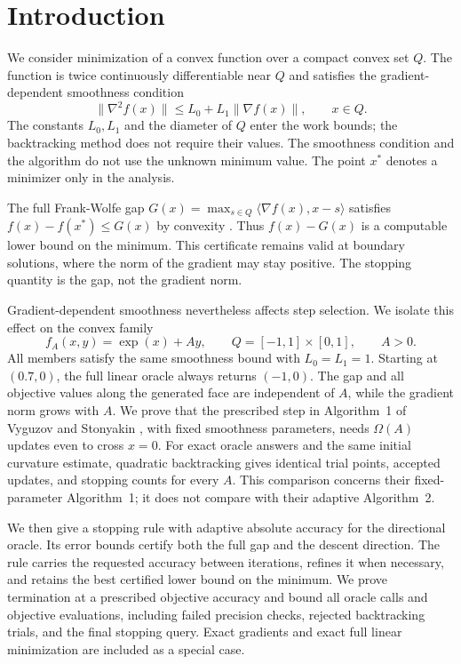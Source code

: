 \section{Introduction}
\label{sec:intro}
We consider minimization of a convex function over a compact convex set
$Q$. The function is twice continuously differentiable near $Q$ and
satisfies the gradient-dependent smoothness condition
\[
 \|\nabla^2 f(x)\|\le L_0+L_1\|\nabla f(x)\|,\qquad x\in Q.
\]
The constants $L_0,L_1$ and the diameter of $Q$ enter the work bounds;
the backtracking method does not require their values.
The smoothness condition and the algorithm do not use the unknown
minimum value. The point $x^*$ denotes a minimizer only in the analysis.

The full Frank-Wolfe gap
$G(x)=\max_{s\in Q}\langle\nabla f(x),x-s\rangle$
satisfies $f(x)-f(x^*)\le G(x)$ by convexity \cite{jaggi}.
Thus $f(x)-G(x)$ is a computable lower bound on the minimum.
This certificate remains valid at boundary solutions, where the
norm of the gradient may stay positive. The stopping quantity is the
gap, not the gradient norm.

Gradient-dependent smoothness nevertheless affects step selection.
We isolate this effect on the convex family
\[
 f_A(x,y)=\exp(x)+Ay,\qquad
 Q=[-1,1]\times[0,1],\qquad A>0.
\]
All members satisfy the same smoothness bound with $L_0=L_1=1$.
Starting at $(0.7,0)$, the full linear oracle always returns $(-1,0)$.
The gap and all objective values along the generated face are independent
of $A$, while the gradient norm grows with $A$.
We prove that the prescribed step in Algorithm~1 of Vyguzov and
Stonyakin \cite{vyguzov}, with fixed smoothness parameters, needs
$\Omega(A)$ updates even to cross $x=0$.
For exact oracle answers and the same initial curvature estimate,
quadratic backtracking gives identical trial points, accepted updates,
and stopping counts for every $A$.
This comparison concerns their fixed-parameter Algorithm~1; it does not
compare with their adaptive Algorithm~2.

We then give a stopping rule with adaptive absolute accuracy for the
directional oracle. Its error bounds certify both the full gap and the
descent direction. The rule carries the requested accuracy between
iterations, refines it when necessary, and retains the best certified
lower bound on the minimum. We prove termination at a prescribed
objective accuracy and bound all oracle calls and objective evaluations,
including failed precision checks, rejected backtracking trials, and the
final stopping query. Exact gradients and exact full linear minimization
are included as a special case.


